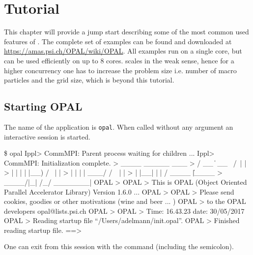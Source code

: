 

\chapter{Tutorial}
\label{chp:tutorial}
This chapter will provide a jump start describing some of the most common used features of \opal. The complete set of examples can be found
and downloaded at \url{https://amas.psi.ch/OPAL/wiki/OPAL}. All examples run on a single core, but can be used
efficiently on up to 8 cores. \opal scales in the weak sense, hence for a higher concurrency one has to increase the problem size i.e. number of
macro particles and the grid size, which is beyond this tutorial.

\section{Starting OPAL}
The name of the application is \texttt{opal}. When called without any argument an interactive session is started.
\begin{example}
\$ opal
Ippl> CommMPI: Parent process waiting for children ...
Ippl> CommMPI: Initialization complete.
>                ____  _____       ___
>               / __ \|  __ \ /\   | |
>              | |  | | |__) /  \  | |
>              | |  | |  ___/ /\ \ | |
>              | |__| | |  / ____ \| |____
>               \____/|_| /_/    \_\______|
OPAL >
OPAL > This is OPAL (Object Oriented Parallel Accelerator Library) Version 1.6.0 ...
OPAL >
OPAL > Please send cookies, goodies or other motivations (wine and beer ... )
OPAL > to the OPAL developers opal@lists.psi.ch
OPAL >
OPAL > Time: 16.43.23 date: 30/05/2017
OPAL > Reading startup file ``/Users/adelmann/init.opal''.
OPAL > Finished reading startup file.
==>
\end{example}
One can exit from this session with the command  (including the semicolon).

